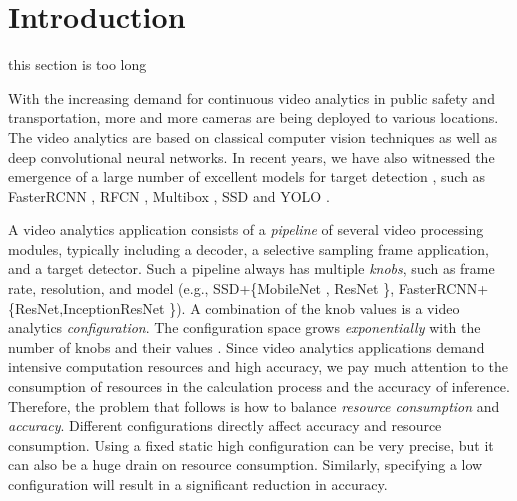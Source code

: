 \section{Introduction}
\textcolor{note}{this section is too long}

\label{Section: introduction}
With the increasing demand for continuous video analytics in public safety and transportation, more and more cameras are being deployed to various locations. The video analytics are based on classical computer vision techniques as well as deep convolutional neural networks. In recent years, we have also witnessed the emergence of a large number of excellent models for target detection \cite{trade-offs}, such as FasterRCNN \cite{ren2015faster_rcnn}, RFCN \cite{dai2016r_fcn}, Multibox \cite{szegedy2014multibox}, SSD \cite{liu2016ssd} and YOLO \cite{redmon2016yolo}.


A video analytics application consists of a \emph{pipeline} of several video processing modules, typically including a decoder, a selective sampling frame application, and a target detector. Such a pipeline always has multiple \emph{knobs}, such as frame rate, resolution, and model (e.g., SSD+\{MobileNet \cite{MobileNetV2}, ResNet \cite{he2016resnet}\}, FasterRCNN+\{ResNet,InceptionResNet \cite{szegedy2016inception}\}). A combination of the knob values is a video analytics \emph{configuration}. The configuration space grows \emph{exponentially} with the number of knobs and their values \cite{jiang2018chameleon}. Since video analytics applications demand intensive computation resources and high accuracy, we pay much attention to the consumption of resources in the calculation process and the accuracy of inference. Therefore, the problem that follows is how to balance \emph{resource consumption} and \emph{accuracy}. Different configurations directly affect accuracy and resource consumption. Using a fixed static high configuration can be very precise, but it can also be a huge drain on resource consumption. Similarly, specifying a low configuration will result in a significant reduction in accuracy.

